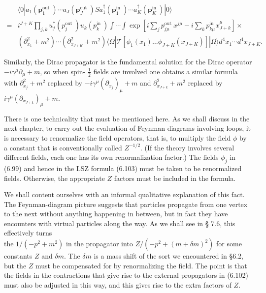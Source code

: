 \documentclass[10pt, letterpaper]{article}
\begin{document}
$$
\begin{aligned}
& \langle 0| a_{1}\left(\mathbf{p}_{1}^{\text {out }}\right) \cdots a_{J}\left(\mathbf{p}_{J}^{\text {out }}\right) S a_{1}^{\dagger}\left(\mathbf{p}_{1}^{\text {in }}\right) \cdots a_{K}^{\dagger}\left(\mathbf{p}_{K}^{\text {in }}\right)|0\rangle \\
= & i^{J+K} \prod_{j, k} u_{j}^{*}\left(p_{j}^{\text {out }}\right) u_{k}\left(p_{k}^{\text {in }}\right) \int \cdots \int \exp \left[i \sum_{j} p_{j \mu}^{\text {out }} x^{j \mu}-i \sum_{k} p_{k \mu}^{\text {in }} x_{J+k}^{\mu}\right] \times \\
& \left(\partial_{x_{1}}^{2}+m^{2}\right) \cdots\left(\partial_{x_{J+K}}^{2}+m^{2}\right)\langle\Omega| \mathcal{T}\left[\phi_{1}\left(x_{1}\right) \ldots \phi_{J+K}\left(x_{J+K}\right)\right]|\Omega\rangle d^{4} x_{1} \cdots d^{4} x_{J+K} .
\end{aligned}
$$

Similarly, the Dirac propagator is the fundamental solution for the Dirac operator $-i \gamma^{\mu} \partial_{\mu}+m$, so when spin- $\frac{1}{2}$ fields are involved one obtains a similar formula with $\partial_{x_{j}}^{2}+m^{2}$ replaced by $-i \gamma^{\mu}\left(\partial_{x_{j}}\right)_{\mu}+m$ and $\partial_{x_{J+k}}^{2}+m^{2}$ replaced by $i \gamma^{\mu}\left(\partial_{x_{J+k}}\right)_{\mu}+m$.

There is one technicality that must be mentioned here. As we shall discuss in the next chapter, to carry out the evaluation of Feynman diagrams involving loops, it is necessary to renormalize the field operators, that is, to multiply the field $\phi$ by a constant that is conventionally called $Z^{-1 / 2}$. (If the theory involves several different fields, each one has its own renormalization factor.) The fields $\phi_{j}$ in (6.99) and hence in the LSZ formula (6.103) must be taken to be renormalized fields. Otherwise, the appropriate $Z$ factors must be included in the formula.

We shall content ourselves with an informal qualitative explanation of this fact. The Feynman-diagram picture suggests that particles propagate from one vertex to the next without anything happening in between, but in fact they have encounters with virtual particles along the way. As we shall see in § 7.6, this effectively turns\\
the $1 /\left(-p^{2}+m^{2}\right)$ in the propagator into $Z /\left(-p^{2}+(m+\delta m)^{2}\right)$ for some constants $Z$ and $\delta m$. The $\delta m$ is a mass shift of the sort we encountered in §6.2, but the $Z$ must be compensated for by renormalizing the field. The point is that the fields in the contractions that give rise to the external propagators in (6.102) must also be adjusted in this way, and this gives rise to the extra factors of $Z$.
\end{document}
